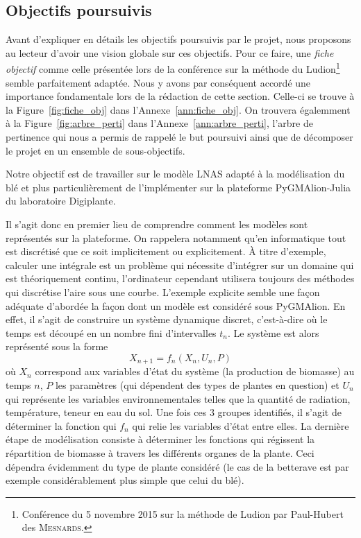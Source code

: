 \subsection{Objectifs poursuivis}
Avant d'expliquer en détails les objectifs poursuivis par le projet,
nous proposons au lecteur d'avoir une vision globale sur ces objectifs.
Pour ce faire, une \emph{fiche objectif} comme celle présentée 
lors de la conférence sur 
la méthode du Ludion\footnote{Conférence du 5 novembre 2015 
sur la méthode de Ludion par Paul-Hubert des \textsc{Mesnards}.} 
semble parfaitement adaptée.
Nous y avons par conséquent accordé une importance fondamentale
lors de la rédaction de cette section.
Celle-ci se trouve à la Figure~\ref{fig:fiche_obj} 
dans l'Annexe~\ref{ann:fiche_obj}.
On trouvera égalemment à la Figure~\ref{fig:arbre_perti}
dans l'Annexe~\ref{ann:arbre_perti}, l'arbre de pertinence
qui nous a permis de rappelé le but poursuivi ainsi
que de décomposer le projet en un ensemble de sous-objectifs.

Notre objectif est de travailler sur le modèle LNAS
adapté à la modélisation du blé et plus particulièrement de l'implémenter
sur la plateforme PyGMAlion-Julia du laboratoire Digiplante.


Il s'agit donc en premier lieu de comprendre comment les modèles
sont représentés sur la plateforme. 
On rappelera notamment qu'en informatique tout est discrétisé
que ce soit implicitement ou explicitement.
À titre d'exemple, calculer une intégrale est un problème
qui nécessite d'intégrer sur un domaine qui est théoriquement continu,
l'ordinateur cependant utilisera toujours des méthodes qui discrétise
l'aire sous une courbe.
L'exemple explicite semble une façon adéquate d'abordée
la façon dont un modèle est considéré sous PyGMAlion.
En effet, il s'agit de construire un système dynamique discret,
c'est-à-dire où le temps est découpé en un nombre fini d'intervalles $t_n$.
Le système est alors représenté sous la forme
\[
  X_{n+1} = f_n(X_n, U_n, P)
\]
où $X_n$ correspond aux variables d'état du système (la production
de biomasse) au temps $n$, $P$ les paramètres (qui dépendent des types
de plantes en question) et $U_n$ qui représente les variables
environnementales telles que la quantité de radiation, température,
teneur en eau du sol.
Une fois ces 3 groupes identifiés, il s'agit de déterminer la fonction
qui $f_n$ qui relie les variables d'état entre elles.
La dernière étape de modélisation consiste à déterminer
les fonctions qui régissent la répartition de biomasse 
à travers les différents organes de la plante.
Ceci dépendra évidemment du type de plante considéré
(le cas de la betterave est par exemple considérablement
plus simple que celui du blé).

